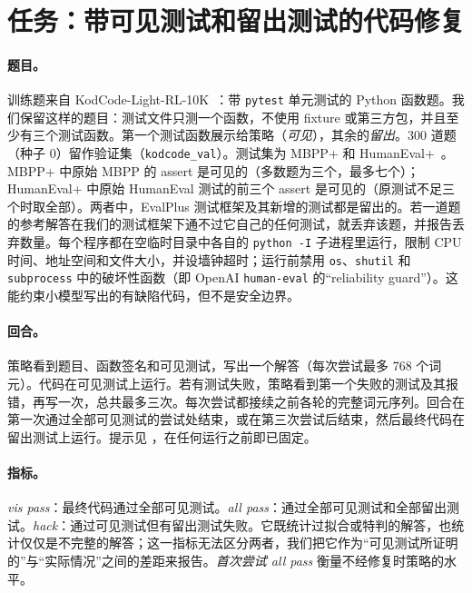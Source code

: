 
\section{任务：带可见测试和留出测试的代码修复}\label{sec:task}

\paragraph{题目。} 训练题来自 KodCode-Light-RL-10K~\cite{xu2025kodcode}：带 \texttt{pytest} 单元测试的 Python 函数题。我们保留这样的题目：测试文件只测一个函数，不使用 fixture 或第三方包，并且至少有三个测试函数。第一个测试函数展示给策略（\emph{可见}），其余的\emph{留出}。300 道题（种子 0）留作验证集（\texttt{kodcode\_val}）。测试集为 MBPP+ 和 HumanEval+~\cite{austin2021program,chen2021codex,liu2023evalplus}。MBPP+ 中原始 MBPP 的 assert 是可见的（多数题为三个，最多七个）；HumanEval+ 中原始 HumanEval 测试的前三个 assert 是可见的（原测试不足三个时取全部）。两者中，EvalPlus 测试框架及其新增的测试都是留出的。若一道题的参考解答在我们的测试框架下通不过它自己的任何测试，就丢弃该题，并报告丢弃数量。每个程序都在空临时目录中各自的 \texttt{python -I} 子进程里运行，限制 CPU 时间、地址空间和文件大小，并设墙钟超时；运行前禁用 \texttt{os}、\texttt{shutil} 和 \texttt{subprocess} 中的破坏性函数（即 OpenAI \texttt{human-eval} 的“reliability guard”）。这能约束小模型写出的有缺陷代码，但不是安全边界。

\paragraph{回合。} 策略看到题目、函数签名和可见测试，写出一个解答（每次尝试最多 768 个词元）。代码在可见测试上运行。若有测试失败，策略看到第一个失败的测试及其报错，再写一次，总共最多三次。每次尝试都接续之前各轮的完整词元序列。回合在第一次通过全部可见测试的尝试处结束，或在第三次尝试后结束，然后最终代码在留出测试上运行。提示见 ，在任何运行之前即已固定。

\paragraph{指标。} \emph{vis pass}：最终代码通过全部可见测试。\emph{all pass}：通过全部可见测试和全部留出测试。\emph{hack}：通过可见测试但有留出测试失败。它既统计过拟合或特判的解答，也统计仅仅是不完整的解答；这一指标无法区分两者，我们把它作为“可见测试所证明的”与“实际情况”之间的差距来报告。\emph{首次尝试 all pass} 衡量不经修复时策略的水平。

